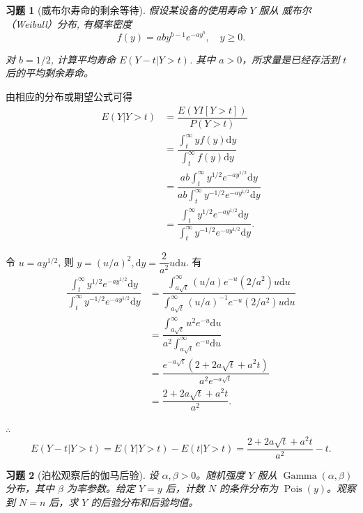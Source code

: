 \documentclass[12pt,fontset=fandol]{ctexart}
\newtheorem{exercise}{习题}[section]
\begin{document}
\begin{exercise}[威布尔寿命的剩余等待]\label{q:A6.14}
假设某设备的使用寿命 $Y$ 服从 威布尔（Weibull）分布, 有概率密度
    \[f(y)=aby^{b-1}e^{-ay^b},\quad y\geq0.\]

    对 $b=1/2$, 计算平均寿命 $E(Y-t|Y>t)$. 其中 $a>0$，所求量是已经存活到 $t$ 后的平均剩余寿命。\par{}
\end{exercise}

\begin{solve}\label{a:A6.14}
    由相应的分布或期望公式可得
    \begin{align*}
        E(Y|Y>t) & =\dfrac{E(YI[Y>t])}{P(Y>t)} \\
        & =\dfrac{\int_t^\infty yf(y)\mathrm{d}y}{\int_t^\infty f(y)\mathrm{d}y} \\
        & =\dfrac{ab\int_t^\infty y^{1/2}e^{-ay^{1/2}}\mathrm{d}y}{ab\int_t^\infty y^{-1/2}e^{-ay^{1/2}}\mathrm{d}y} \\
        & =\dfrac{\int_t^\infty y^{1/2}e^{-ay^{1/2}}\mathrm{d}y}{\int_t^\infty y^{-1/2}e^{-ay^{1/2}}\mathrm{d}y}.
    \end{align*}

    令 $u=ay^{1/2}$, 则 $y=(u/a)^2,\mathrm{d}y=\dfrac{2}{a^2}u\mathrm{d}u$. 有
    \begin{align*}
        \dfrac{\int_t^\infty y^{1/2}e^{-ay^{1/2}}\mathrm{d}y}{\int_t^\infty y^{-1/2}e^{-ay^{1/2}}\mathrm{d}y} & =\dfrac{\int_{a\sqrt{t}}^\infty(u/a)e^{-u}(2/a^2)u\mathrm{d}u}{\int_{a\sqrt{t}}^\infty(u/a)^{-1}e^{-u}(2/a^2)u\mathrm{d}u} \\
        & =\dfrac{\int_{a\sqrt{t}}^\infty u^2e^{-u}\mathrm{d}u}{a^2\int_{a\sqrt{t}}^\infty e^{-u}\mathrm{d}u} \\
        & =\dfrac{e^{-a\sqrt{t}}(2+2a\sqrt{t}+a^2t)}{a^2e^{-a\sqrt{t}}} \\
        & =\dfrac{2+2a\sqrt{t}+a^2t}{a^2}.
    \end{align*}

    $\therefore$
    \[E(Y-t|Y>t)=E(Y|Y>t)-E(t|Y>t)=\dfrac{2+2a\sqrt{t}+a^2t}{a^2}-t.\]
\end{solve}

\begin{exercise}[泊松观察后的伽马后验]\label{q:A6.15}
设 $\alpha,\beta>0$。随机强度 $Y$ 服从 $\operatorname{Gamma}(\alpha,\beta)$ 分布，其中 $\beta$ 为率参数。给定 $Y=y$ 后，计数 $N$ 的条件分布为 $\operatorname{Pois}(y)$。观察到 $N=n$ 后，求 $Y$ 的后验分布和后验均值。\par{}
\end{exercise}
\end{document}
